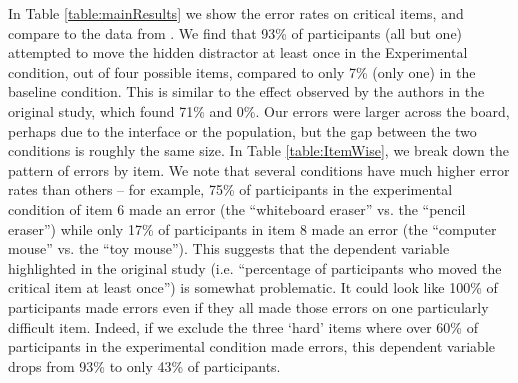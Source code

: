 \documentclass[10pt,letterpaper]{article}
\begin{document}
In Table \ref{table:mainResults} we show the error rates on critical items, and compare to the data from
.
We find that 93\% of participants (all but one) attempted to move the hidden distractor at least once in the Experimental condition, out of four possible items, compared to only 7\% (only one) in the baseline condition. This is similar to the effect observed by the authors in the original study, which found 71\% and 0\%. Our errors were larger across the board, perhaps due to the interface or the population, but the gap between the two conditions is roughly the same size.
In Table \ref{table:ItemWise}, we break down the pattern of errors by item. 
We note that several conditions have much higher error rates than others -- for example, 75\% of participants in the experimental condition of item 6 made an error (the ``whiteboard eraser'' vs. the ``pencil eraser'') while only 17\% of participants in item 8 made an error (the ``computer mouse'' vs. the ``toy mouse''). 
This suggests that the dependent variable highlighted in the original study (i.e. ``percentage of participants who moved the critical item at least once'') is somewhat problematic. It could look like 100\% of participants made errors even if they all made those errors on one particularly difficult item. Indeed, if we exclude the three `hard' items where over 60\% of participants in the experimental condition made errors, this dependent variable drops from 93\% to only 43\% of participants. 
\end{document}
